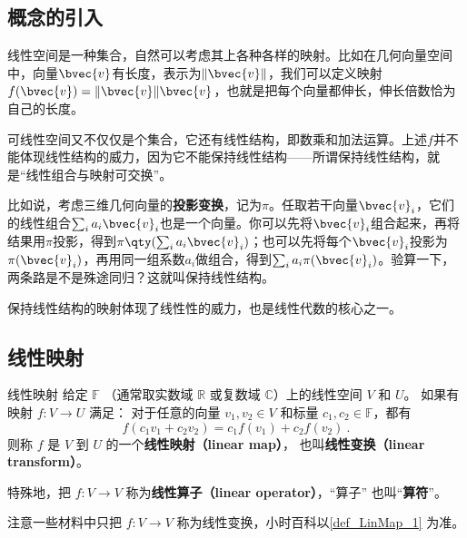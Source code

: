
\begin{issues}
\end{issues}




\subsection{概念的引入}

线性空间是一种集合，自然可以考虑其上各种各样的映射。比如在几何向量空间中，向量$\bvec{v}$有长度，表示为$\lVert \bvec{v} \rVert$，我们可以定义映射$f(\bvec{v})=\lVert \bvec{v} \rVert\bvec{v}$，也就是把每个向量都伸长，伸长倍数恰为自己的长度。

可线性空间又不仅仅是个集合，它还有线性结构，即数乘和加法运算。上述$f$并不能体现线性结构的威力，因为它不能保持线性结构——所谓保持线性结构，就是“线性组合与映射可交换”。

比如说，考虑三维几何向量的\textbf{投影变换}，记为$\pi$。任取若干向量$\bvec{v}_i$，它们的线性组合$\sum_{i}a_i\bvec{v}_i$也是一个向量。你可以先将$\bvec{v}_i$组合起来，再将结果用$\pi$投影，得到$\pi\qty(\sum_{i}a_i\bvec{v}_i)$；也可以先将每个$\bvec{v}_i$投影为$\pi(\bvec{v}_i)$，再用同一组系数$a_i$做组合，得到$\sum_{i}a_i\pi(\bvec{v}_i)$。验算一下，两条路是不是殊途同归？这就叫保持线性结构。

保持线性结构的映射体现了线性性的威力，也是线性代数的核心之一。

\subsection{线性映射}

\begin{definition}{线性映射}\label{def_LinMap_1}
给定 $\mathbb F$ （通常取实数域 $\mathbb R$ 或复数域 $\mathbb C$）上的线性空间 $V$ 和 $U$。 如果有映射 $f:V\rightarrow U$ 满足： 对于任意的向量 ${v}_1, {v}_2\in V$ 和标量 $c_1, c_2 \in \mathbb{F}$，都有
\begin{equation}
f(c_1 {v}_1+c_2 {v}_2)=c_1f({v}_1)+c_2f({v}_2)~.
\end{equation}
则称 $f$ 是 $V$ 到 $U$ 的一个\textbf{线性映射（linear map）}， 也叫\textbf{线性变换（linear transform）}。

特殊地，把 $f:V\to V$ 称为\textbf{线性算子（linear operator）}，“算子” 也叫“\textbf{算符}”。
\end{definition}
注意一些材料中只把 $f:V\to V$ 称为线性变换，小时百科以\autoref{def_LinMap_1} 为准。

